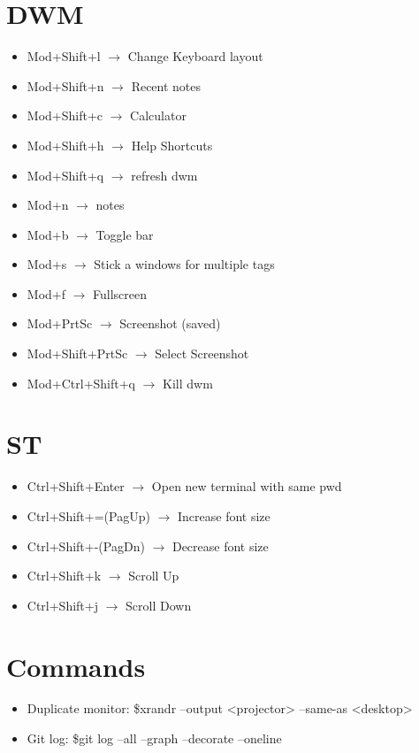 \documentclass[a4paper,10pt]{article}
\begin{document}
\section{DWM}
\begin{itemize}
  \item Mod+Shift+l $\to$ Change Keyboard layout
  \item Mod+Shift+n $\to$ Recent notes
  \item Mod+Shift+c $\to$ Calculator
  \item Mod+Shift+h $\to$ Help Shortcuts
  \item Mod+Shift+q $\to$ refresh dwm
  \item Mod+n $\to$ notes
  \item Mod+b $\to$ Toggle bar
  \item Mod+s $\to$ Stick a windows for multiple tags
  \item Mod+f $\to$ Fullscreen
  \item Mod+PrtSc $\to$ Screenshot (saved)
  \item Mod+Shift+PrtSc $\to$ Select Screenshot
  \item Mod+Ctrl+Shift+q $\to$ Kill dwm
\end{itemize}

\section{ST}
\begin{itemize}
  \item Ctrl+Shift+Enter $\to$ Open new terminal with same pwd
  \item Ctrl+Shift+=(PagUp) $\to$ Increase font size
  \item Ctrl+Shift+-(PagDn) $\to$ Decrease font size
  \item Ctrl+Shift+k $\to$ Scroll Up
  \item Ctrl+Shift+j $\to$ Scroll Down
\end{itemize}
\section{Commands}
\begin{itemize}
  \item Duplicate monitor: \$xrandr --output <projector> --same-as <desktop>
  \item Git log: \$git log --all --graph --decorate --oneline

    \newpage
\end{itemize}
\end{document}
